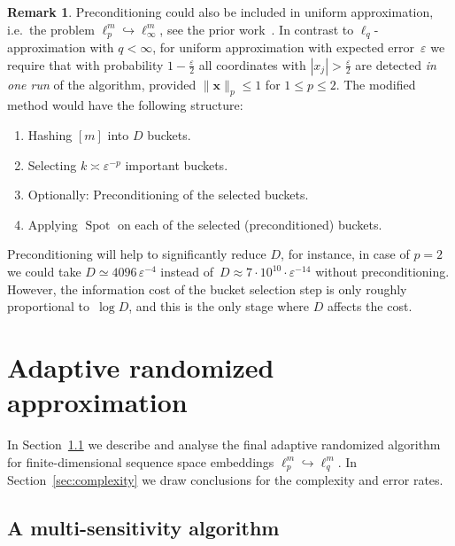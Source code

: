 \documentclass[12pt]{article}
\theoremstyle{plain}
\theoremstyle{definition}
\newtheorem{remark}[theorem]{Remark}
\newcommand{\eps}{\varepsilon}
\newcommand{\embed}{\hookrightarrow}
\renewcommand{\vec}{\boldsymbol}
\DeclareMathOperator{\spot}{Spot}
\begin{document}
\begin{remark}
    Preconditioning could also be included in uniform approximation, i.e.\ the problem $\ell_p^m \embed \ell_\infty^m$, see the prior work~\cite{KW24b}.
    In contrast to $\ell_q$-approximation with $q<\infty$,
    for uniform approximation with expected error~$\eps$ we require that with probability $1 - \frac{\eps}{2}$
    all coordinates with $|x_j|>\frac{\eps}{2}$ are detected \emph{in one run} of the algorithm, provided $\|\vec{x}\|_p \leq 1$ for $1 \leq p \leq 2$.
    The modified method would have the following structure:
    \begin{enumerate}
        \item Hashing $[m]$ into $D$ buckets.
        \item Selecting $k \asymp \eps^{-p}$ important buckets.
        \item Optionally: Preconditioning of the selected buckets.
        \item Applying $\spot$ on each of the selected (preconditioned) buckets.
    \end{enumerate}
    Preconditioning will help to significantly reduce $D$,
    for instance, in case of $p=2$ we could take
    $D \simeq 4096 \, \eps^{-4}$
    instead of~$D \approx 7 \cdot 10^{10} \cdot \eps^{-14}$
    without preconditioning.
    However, the information cost of the bucket selection step is only roughly proportional to~$\log D$, and this is the only stage where $D$ affects the cost.
\end{remark}

\section{Adaptive randomized approximation}
\label{sec:Approx}

In Section~\ref{sec:MSF} we describe and analyse the final adaptive randomized algorithm
for finite-dimensional sequence space embeddings $\ell_p^m \embed \ell_q^m$.
In Section~\ref{sec:complexity} we draw conclusions for the complexity and error rates.

\subsection{A multi-sensitivity algorithm}
\label{sec:MSF}
\end{document}

